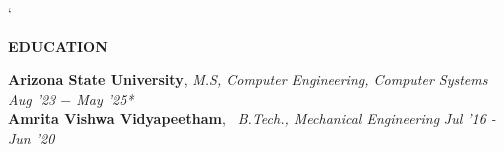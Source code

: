 \documentclass[10pt,a4]{article}
\def\hrulefill{\leavevmode\leaders\hrule height 1pt\hfill\kern0pt}		%
\begin{document}
{\begin{flushleft}

`
\end{flushleft}

\vspace{1.0mm}
\begin{flushleft}
	{\Large \textbf{EDUCATION}} %

    	\hspace{1.5mm} \textbf{\large Arizona State University}, \textit{M.S, Computer Engineering, Computer Systems}  \hfill \textit{Aug '23 $-$ May '25*}	\\

        \hspace{1.5mm} \textbf{\large Amrita Vishwa Vidyapeetham}, \textit{\ B.Tech., Mechanical Engineering} \hfill \textit{ Jul '16 - Jun '20}	\\

\end{flushleft}
}
\end{document}
